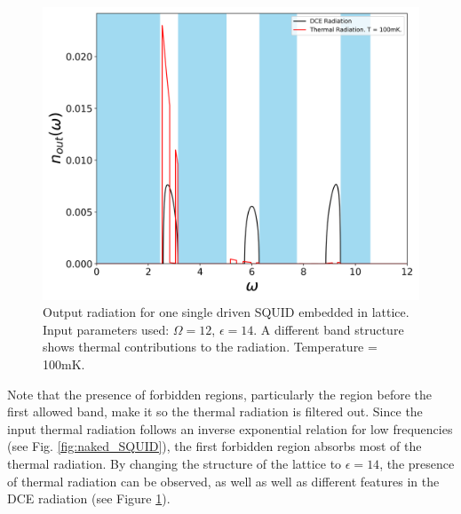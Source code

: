 \begin{figure}[h]
    \centering
    \includegraphics[width=\textwidth, keepaspectratio]{figures/results/one_SQUID_active_epsilon_14_100mK.png}
    \caption{Output radiation for one single driven SQUID embedded in lattice. Input parameters used: $\Omega=12$, $\epsilon=14$. A different band structure shows thermal contributions to the radiation. Temperature = 100mK.}
    \label{fig:one_SQUID_active_e_14_T_100}
\end{figure}
%
\newpage
Note that the presence of forbidden regions, particularly the region before the first allowed band, make it so the thermal radiation is filtered out. Since the input thermal radiation follows an inverse exponential relation for low frequencies (see Fig. \ref{fig:naked_SQUID}), the first forbidden region absorbs most of the thermal radiation. By changing the structure of the lattice to $\epsilon = 14$, the presence of thermal radiation can be observed, as well as well as different features in the DCE radiation (see Figure \ref{fig:one_SQUID_active_e_14_T_100}).
%
